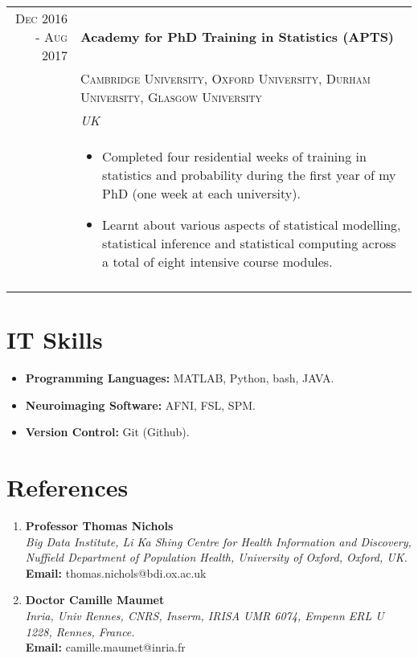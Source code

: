 \documentclass[a4paper,10pt]{article}
\begin{document}
\begin{tabular}{rl}
\textsc{Dec} 2016 - \textsc{Aug} 2017
& \large{\textbf{Academy for PhD Training in Statistics (APTS)}}\\
& \textsc{Cambridge University, Oxford University, Durham University, Glasgow University}\\
& \textit{UK} \\
&\begin{minipage}[t]{0.8\textwidth}
 \begin{itemize}[leftmargin=*]
 \item Completed four residential weeks of training in statistics and probability during the first year of my PhD (one week at each university).
 \item Learnt about various aspects of statistical modelling, statistical inference and statistical computing across a total of eight intensive course modules. 
\end{itemize}
\end{minipage}\\&\\

\end{tabular}


\section{IT Skills}
\begin{minipage}[t]{0.9\textwidth}
 \begin{itemize}
 \item \textbf{Programming Languages:} MATLAB, Python, bash, JAVA.
 \item \textbf{Neuroimaging Software:} AFNI, FSL, SPM. 
 \item \textbf{Version Control:} Git (Github). 
 \end{itemize}
\end{minipage}

\section{References}
\begin{enumerate}
\item \textbf{Professor Thomas Nichols} \\
\textit{Big Data Institute, Li Ka Shing Centre for Health Information and Discovery, Nuffield Department of Population
Health, University of Oxford, Oxford, UK.} \\
\textbf{Email:} thomas.nichols@bdi.ox.ac.uk\\
	
\item \textbf{Doctor Camille Maumet} \\
\textit{Inria, Univ Rennes, CNRS, Inserm, IRISA UMR 6074, Empenn ERL U 1228, Rennes, France.} \\
\textbf{Email:} camille.maumet@inria.fr \\
\end{enumerate}



\end{document}
